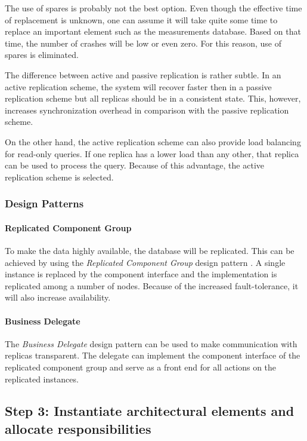 \npar The use of spares is probably not the best option. Even though the
effective time of replacement is unknown, one can assume it will take quite some
time to replace an important element such as the measurements database. Based on
that time, the number of crashes will be low or even zero. For this reason, use
of spares is eliminated.

\npar The difference between active and passive replication is rather subtle.
In an active replication scheme, the system will recover faster then in a
passive replication scheme but all replicas should be in a consistent
state. This, however, increases synchronization overhead in comparison with
the passive replication scheme.

\npar On the other hand, the active replication scheme can also provide load
balancing for read-only queries. If one replica has a lower load than any other,
that replica can be used to process the query. Because of this advantage, the
active replication scheme is selected.

\subsubsection{Design Patterns}
\label{add:it4/patterns}

\paragraph{Replicated Component Group} 

\npar To make the data highly available, the database will be replicated. This
can be achieved by using the \emph{Replicated Component Group} design pattern
\citep[see][p.~326]{Buschmann:07}. A single instance is replaced by the
component interface and the implementation is replicated among a number of
nodes. Because of the increased fault-tolerance, it will also increase availability.

\paragraph{Business Delegate}

\npar The \emph{Business Delegate} design pattern
\citep[see][p.~292]{Buschmann:07} can be used to make communication with
replicas transparent. The delegate can implement the component interface of the
replicated component group and serve as a front end for all actions on the
replicated instances.

\subsection{Step 3: Instantiate architectural elements and allocate responsibilities}
\label{add:it4/elements}

